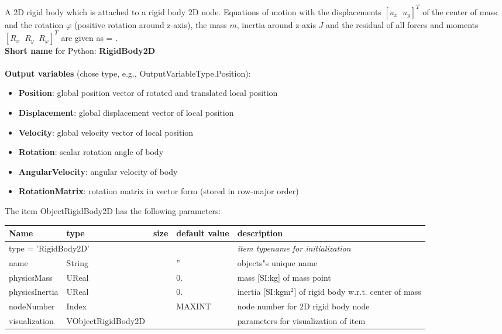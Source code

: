 A 2D rigid body which is attached to a rigid body 2D node. Equations of motion with the displacements $[u_x\;\; u_y]^T$ of the center of mass and the rotation $\varphi$ (positive rotation around z-axis), the mass $m$, inertia around z-axis $J$ and the residual of all forces and moments $[R_x\;\; R_y\;\; R_\varphi]^T$ are given as \be {} = .\ee
 \\
{\bf Short name} for Python: {\bf RigidBody2D}
 \\\\ 
{\bf Output variables} (chose type, e.g., OutputVariableType.Position): 
\begin{itemize}
    \item {\bf Position}: global position vector of rotated and translated local position
    \item {\bf Displacement}: global displacement vector of local position
    \item {\bf Velocity}: global velocity vector of local position
    \item {\bf Rotation}: scalar rotation angle of body
    \item {\bf AngularVelocity}: angular velocity of body
    \item {\bf RotationMatrix}: rotation matrix in vector form (stored in row-major order)
\end{itemize}
The item ObjectRigidBody2D has the following parameters:
\begin{center}
  \footnotesize
  \begin{longtable}{| p{4.5cm} | p{2.5cm} | p{0.5cm} | p{2.5cm} | p{6cm} |}
    \hline
    \bf Name & \bf type & \bf size & \bf default value & \bf description \\ \hline
    \multicolumn{4}{l}{\parbox{10cm}{type = 'RigidBody2D'}} & \multicolumn{1}{l}{\parbox{6cm}{\it item typename for initialization}}\\ \hline
    name &     String &      &     '' &     objects"s unique name\\ \hline
    physicsMass &     UReal &      &     0. &     mass [SI:kg] of mass point\\ \hline
    physicsInertia &     UReal &      &     0. &     inertia [SI:kgm$^2$] of rigid body w.r.t. center of mass\\ \hline
    nodeNumber &     Index &      &     MAXINT &     node number for 2D rigid body node\\ \hline
    visualization & VObjectRigidBody2D & & & parameters for visualization of item \\ \hline
	  \end{longtable}
	\end{center}
